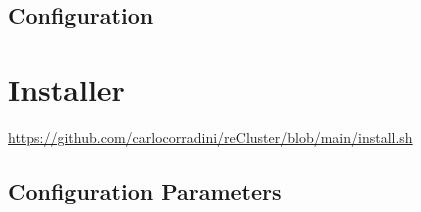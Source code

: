 \subsection{Configuration}
\label{subsec:implementation_server_configuration}


\section{Installer}
\label{sec:implementation_installer}

\url{https://github.com/carlocorradini/reCluster/blob/main/install.sh}

\subsection{Configuration Parameters}
\label{subsec:implementation_installer_configuration_parameters}

